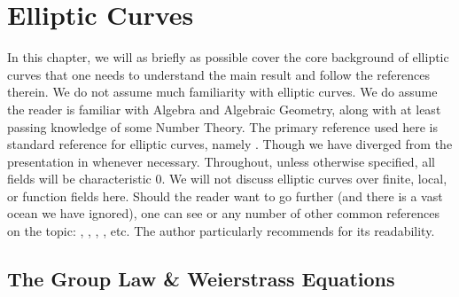 \chapter{Elliptic Curves\label{ch:ec}}

In this chapter, we will as briefly as possible cover the core background of elliptic curves that one needs to understand the main result and follow the references therein. We do not assume much familiarity with elliptic curves. We do assume the reader is familiar with Algebra and Algebraic Geometry, along with at least passing knowledge of some Number Theory. The primary reference used here is  standard reference for elliptic curves, namely \cite{silvermanarithmetic}. Though we have diverged from the presentation in \cite{silvermanarithmetic} whenever necessary. Throughout, unless otherwise specified, all fields will be characteristic 0. We will not discuss elliptic curves over finite, local, or function fields here. Should the reader want to go further (and there is a vast ocean we have ignored), one can see \cite{silvermanarithmetic} or any number of other common references on the topic: \cite{silvermanrational}, \cite{washington03}, \cite{knapp92}, \cite{milne06}, etc. The author particularly recommends \cite{husemoller04} for its readability. 





\section{The Group Law \& Weierstrass Equations\label{sec:equations}}

